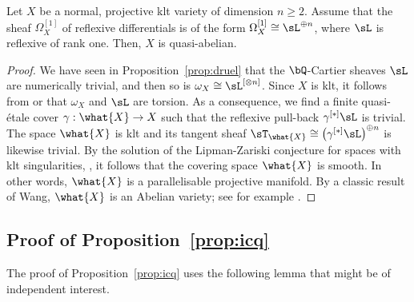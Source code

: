 \begin{thm}\label{thm:druel}
Let $X$ be a normal, projective klt variety of dimension $n \geq 2$. Assume that
the sheaf $\Omega^{[1]}_X$ of reflexive differentials is of the form
$\Omega^{[1]}_X \cong \sL^{\oplus n}$, where $\sL$ is reflexive of rank one. Then, $X$ is
quasi-abelian.
\end{thm}
\begin{proof}
We have seen in Proposition~\ref{prop:druel} that the $\bQ$-Cartier sheaves $\sL$
are numerically trivial, and then so is $\omega_X \cong \sL^{[\otimes n]}$. Since $X$ is klt,
it follows from \cite[Prop.\,V.4.9]{Nakayama04} or \cite[Th.\,4.2]{MR2134273}
that $\omega_X$ and $\sL$ are torsion. As a consequence, we find a finite
quasi-étale cover $\gamma: \what{X} \to X$ such that the reflexive pull-back
$\gamma^{[*]} \sL$ is trivial. The space $\what{X}$ is klt and its tangent sheaf
$\sT_{\what{X}} \cong \left(\gamma^{[*]} \sL \right)^{\oplus n}$ is likewise trivial. By the
solution of the Lipman-Zariski conjecture for spaces with klt singularities,
\cite[Th.\,6]{GKKP11}, it follows that the covering space $\what{X}$ is
smooth. In other words, $\what{X}$ is a parallelisable projective manifold.
By a classic result of Wang, $\what{X}$ is an Abelian variety; see for example
\cite[\S 3.9, Lem.\,1]{MR1334091}.
\end{proof}

\subsection{Proof of Proposition~\ref*{prop:icq}}
\label{ssec:popicq}

The proof of Proposition~\ref{prop:icq} uses the following lemma that might be
of independent interest.

